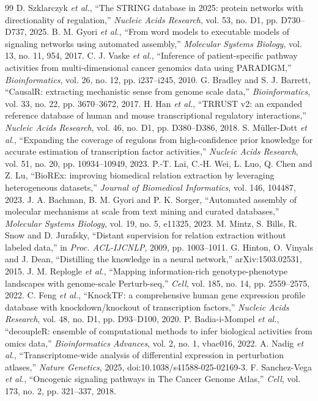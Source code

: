 \documentclass[11pt,a4paper]{article}
\begin{document}
\begin{thebibliography}{99}
 D. Szklarczyk \emph{et al.}, ``The STRING database in 2025: protein networks
  with directionality of regulation,'' \emph{Nucleic Acids Research}, vol. 53, no. D1,
  pp. D730--D737, 2025.
 B. M. Gyori \emph{et al.}, ``From word models to executable models of signaling
  networks using automated assembly,'' \emph{Molecular Systems Biology}, vol. 13, no. 11, 954,
  2017.
 C. J. Vaske \emph{et al.}, ``Inference of patient-specific pathway activities
  from multi-dimensional cancer genomics data using PARADIGM,'' \emph{Bioinformatics}, vol. 26,
  no. 12, pp. i237--i245, 2010.
 G. Bradley and S. J. Barrett, ``CausalR: extracting mechanistic sense from
  genome scale data,'' \emph{Bioinformatics}, vol. 33, no. 22, pp. 3670--3672, 2017.
 H. Han \emph{et al.}, ``TRRUST v2: an expanded reference database of human and
  mouse transcriptional regulatory interactions,'' \emph{Nucleic Acids Research}, vol. 46,
  no. D1, pp. D380--D386, 2018.
 S. M\"uller-Dott \emph{et al.}, ``Expanding the coverage of regulons from
  high-confidence prior knowledge for accurate estimation of transcription factor activities,''
  \emph{Nucleic Acids Research}, vol. 51, no. 20, pp. 10934--10949, 2023.
 P.-T. Lai, C.-H. Wei, L. Luo, Q. Chen and Z. Lu, ``BioREx: improving biomedical
  relation extraction by leveraging heterogeneous datasets,'' \emph{Journal of Biomedical
  Informatics}, vol. 146, 104487, 2023.
 J. A. Bachman, B. M. Gyori and P. K. Sorger, ``Automated assembly of
  molecular mechanisms at scale from text mining and curated databases,'' \emph{Molecular Systems
  Biology}, vol. 19, no. 5, e11325, 2023.
 M. Mintz, S. Bills, R. Snow and D. Jurafsky, ``Distant supervision for relation
  extraction without labeled data,'' in \emph{Proc. ACL-IJCNLP}, 2009, pp. 1003--1011.
 G. Hinton, O. Vinyals and J. Dean, ``Distilling the knowledge in a neural
  network,'' arXiv:1503.02531, 2015.
 J. M. Replogle \emph{et al.}, ``Mapping information-rich genotype-phenotype
  landscapes with genome-scale Perturb-seq,'' \emph{Cell}, vol. 185, no. 14, pp. 2559--2575, 2022.
 C. Feng \emph{et al.}, ``KnockTF: a comprehensive human gene expression profile
  database with knockdown/knockout of transcription factors,'' \emph{Nucleic Acids Research},
  vol. 48, no. D1, pp. D93--D100, 2020.
 P. Badia-i-Mompel \emph{et al.}, ``decoupleR: ensemble of computational
  methods to infer biological activities from omics data,'' \emph{Bioinformatics Advances},
  vol. 2, no. 1, vbac016, 2022.
 A. Nadig \emph{et al.}, ``Transcriptome-wide analysis of differential expression
  in perturbation atlases,'' \emph{Nature Genetics}, 2025, doi:10.1038/s41588-025-02169-3.
 F. Sanchez-Vega \emph{et al.}, ``Oncogenic signaling pathways in The
  Cancer Genome Atlas,'' \emph{Cell}, vol. 173, no. 2, pp. 321--337, 2018.
\end{thebibliography}
\endgroup
\end{document}
